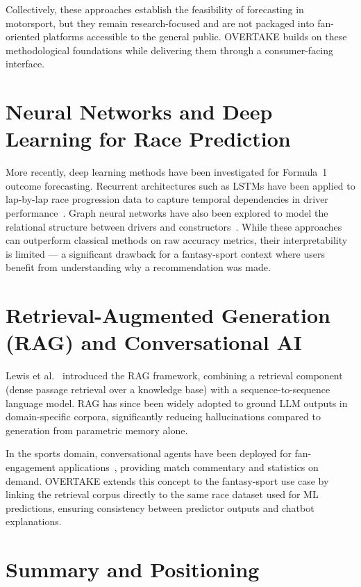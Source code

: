 \documentclass[12pt, a4paper, oneside]{report}
\begin{document}
Collectively, these approaches establish the feasibility of forecasting in
motorsport, but they remain research-focused and are not packaged into
fan-oriented platforms accessible to the general public. OVERTAKE builds on
these methodological foundations while delivering them through a
consumer-facing interface.

\section{Neural Networks and Deep Learning for Race Prediction}

More recently, deep learning methods have been investigated for Formula~1
outcome forecasting. Recurrent architectures such as LSTMs have been applied to
lap-by-lap race progression data to capture temporal dependencies in driver
performance~\cite{heilmeierRace2018}. Graph neural networks have also been
explored to model the relational structure between drivers and
constructors~\cite{huynhGNN2022}. While these approaches can outperform
classical methods on raw accuracy metrics, their interpretability is limited ---
a significant drawback for a fantasy-sport context where users benefit from
understanding why a recommendation was made.

\section{Retrieval-Augmented Generation (RAG) and Conversational AI}

Lewis et al.~\cite{lewisRAG2020} introduced the RAG framework, combining a
retrieval component (dense passage retrieval over a knowledge base) with a
sequence-to-sequence language model. RAG has since been widely adopted to
ground LLM outputs in domain-specific corpora, significantly reducing
hallucinations compared to generation from parametric memory alone.

In the sports domain, conversational agents have been deployed for
fan-engagement applications~\cite{sportradar2023}, providing match commentary
and statistics on demand. OVERTAKE extends this concept to the fantasy-sport
use case by linking the retrieval corpus directly to the same race dataset used
for ML predictions, ensuring consistency between predictor outputs and chatbot
explanations.

\section{Summary and Positioning}
\end{document}
